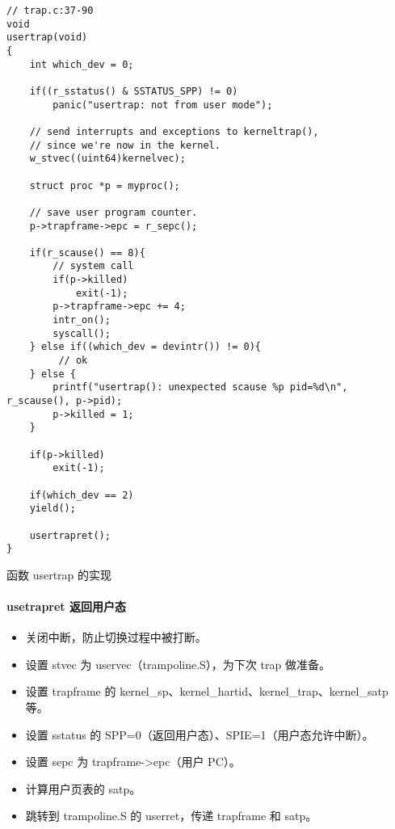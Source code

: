 \begin{listing}[!htb]
	\begin{verbatim}
// trap.c:37-90
void
usertrap(void)
{
    int which_dev = 0;

    if((r_sstatus() & SSTATUS_SPP) != 0)
        panic("usertrap: not from user mode");

    // send interrupts and exceptions to kerneltrap(),
    // since we're now in the kernel.
    w_stvec((uint64)kernelvec);
    
    struct proc *p = myproc();
    
    // save user program counter.
    p->trapframe->epc = r_sepc();

    if(r_scause() == 8){
        // system call
        if(p->killed)
            exit(-1);
        p->trapframe->epc += 4;
        intr_on();
        syscall();
    } else if((which_dev = devintr()) != 0){
         // ok
    } else {
        printf("usertrap(): unexpected scause %p pid=%d\n", r_scause(), p->pid);
        p->killed = 1;
    }

    if(p->killed)
        exit(-1);
    
    if(which_dev == 2)
    yield();
    
    usertrapret();
}
	\end{verbatim}
	\caption{函数 usertrap 的实现}\label{lst:usertrap}
\end{listing}

\paragraph{usetrapret 返回用户态}

\begin{itemize}
	\item 关闭中断，防止切换过程中被打断。
	\item 设置 stvec 为 uservec（trampoline.S），为下次 trap 做准备。
	\item 设置 trapframe 的 kernel\_sp、kernel\_hartid、kernel\_trap、kernel\_satp 等。
	\item 设置 sstatus 的 SPP=0（返回用户态）、SPIE=1（用户态允许中断）。
	\item 设置 sepc 为 trapframe->epc（用户 PC）。
	\item 计算用户页表的 satp。
	\item 跳转到 trampoline.S 的 userret，传递 trapframe 和 satp。
\end{itemize}

